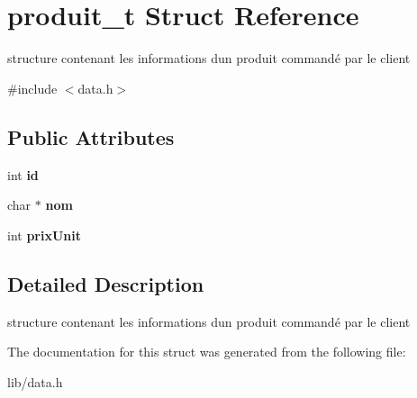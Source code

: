 \hypertarget{structproduit__t}{}\section{produit\+\_\+t Struct Reference}
\label{structproduit__t}


structure contenant les informations d\textquotesingle{}un produit commandé par le client  




{\ttfamily \#include $<$data.\+h$>$}

\subsection*{Public Attributes}
\begin{DoxyCompactItemize}
\item 
\mbox{\label{structproduit__t_a108cfc812f7e306cb1e3d079c1cef2b3}} 
int {\bfseries id}
\item 
\mbox{\label{structproduit__t_a0f8efb35be7dc0d422529a86333ee83e}} 
char $\ast$ {\bfseries nom}
\item 
\mbox{\label{structproduit__t_aef99081688b3a1f4c8ab76acdeafffae}} 
int {\bfseries prix\+Unit}
\end{DoxyCompactItemize}


\subsection{Detailed Description}
structure contenant les informations d\textquotesingle{}un produit commandé par le client 

The documentation for this struct was generated from the following file\+:\begin{DoxyCompactItemize}
\item 
lib/data.\+h\end{DoxyCompactItemize}
